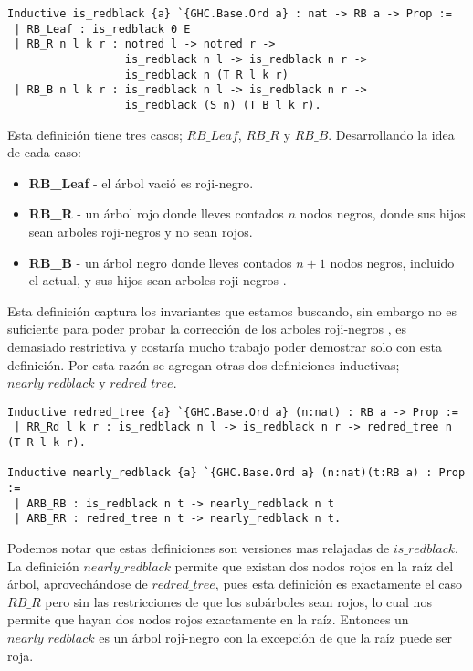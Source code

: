 \documentclass[letterpaper,12pt,oneside]{book}
\newcommand{\arn}{árbol roji-negro }
\newcommand{\arns}{arboles roji-negros }
\theoremstyle{plain}
\theoremstyle{definition}
\theoremstyle{remark}
\begin{document}
\begin{verbatim}
Inductive is_redblack {a} `{GHC.Base.Ord a} : nat -> RB a -> Prop :=
 | RB_Leaf : is_redblack 0 E
 | RB_R n l k r : notred l -> notred r ->
                  is_redblack n l -> is_redblack n r ->
                  is_redblack n (T R l k r)
 | RB_B n l k r : is_redblack n l -> is_redblack n r ->
                  is_redblack (S n) (T B l k r).
\end{verbatim}

Esta definici\'on tiene tres casos; $RB\_Leaf$, $RB\_R$ y $RB\_B$. Desarrollando la idea de cada caso:
\begin{itemize}
        \item \textbf{RB\_Leaf} - el árbol vació es roji-negro.
        \item \textbf{RB\_R} - un árbol rojo donde lleves contados $n$ nodos negros, donde sus hijos sean \arns y no sean rojos.
        \item \textbf{RB\_B} - un árbol negro donde lleves contados $n+1$ nodos negros, incluido el actual, y sus hijos sean \arns.
\end{itemize}

Esta definici\'on captura los invariantes que estamos buscando, sin embargo no es suficiente para poder probar la correcci\'on de los \arns,
es demasiado restrictiva y costaría mucho trabajo poder demostrar solo con esta definici\'on. Por esta razón se agregan otras dos definiciones inductivas;
$nearly\_redblack$ y $redred\_tree$. 

\begin{verbatim}
Inductive redred_tree {a} `{GHC.Base.Ord a} (n:nat) : RB a -> Prop :=
 | RR_Rd l k r : is_redblack n l -> is_redblack n r -> redred_tree n (T R l k r).

Inductive nearly_redblack {a} `{GHC.Base.Ord a} (n:nat)(t:RB a) : Prop :=
 | ARB_RB : is_redblack n t -> nearly_redblack n t
 | ARB_RR : redred_tree n t -> nearly_redblack n t.
\end{verbatim}

Podemos notar que estas definiciones son versiones mas relajadas de $is\_redblack$. La definici\'on $nearly\_redblack$ permite que existan dos nodos rojos
en la ra\'iz del \'arbol, aprovech\'andose de $redred\_tree$, pues esta definici\'on es exactamente el caso $RB\_R$ pero sin las restricciones de que los sub\'arboles sean rojos, lo 
cual nos permite que hayan dos nodos rojos exactamente en la ra\'iz. Entonces un $nearly\_redblack$ es un \arn con la excepci\'on de que la ra\'iz puede ser roja. 
\end{document}
